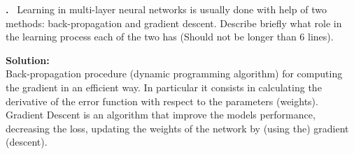 \documentclass[12pt]{article}
\newcounter{problem}
\newcounter{solution}
\newcommand\Problem{%
	\stepcounter{problem}%
	\textbf{\theproblem.}~%
	\setcounter{solution}{0}%
}
\newcommand\Solution{%
	\textbf{Solution:}\\%
}
\begin{document}
\Problem{Learning in multi-layer neural networks is usually done with help of two methods: back-propagation and gradient descent. Describe briefly what role in the learning process each of the two has (Should not be longer than $6$ lines).}

\Solution{Back-propagation  procedure (dynamic programming algorithm) for computing the gradient in an efficient way. In particular it consists in calculating the derivative of the error function with respect to the parameters (weights).\\
Gradient Descent is an algorithm that improve the models performance, decreasing the loss, updating the weights of the network by (using the) gradient (descent).}
\printbibliography
\nocite{*}
\end{document}
